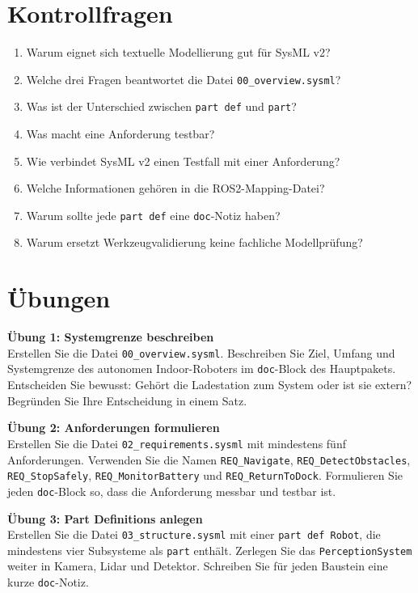 \section{Kontrollfragen}
\begin{enumerate}
    \item Warum eignet sich textuelle Modellierung gut für SysML v2?
    \item Welche drei Fragen beantwortet die Datei \texttt{00\_overview.sysml}?
    \item Was ist der Unterschied zwischen \texttt{part def} und \texttt{part}?
    \item Was macht eine Anforderung testbar?
    \item Wie verbindet SysML v2 einen Testfall mit einer Anforderung?
    \item Welche Informationen gehören in die ROS2-Mapping-Datei?
    \item Warum sollte jede \texttt{part def} eine \texttt{doc}-Notiz haben?
    \item Warum ersetzt Werkzeugvalidierung keine fachliche Modellprüfung?
\end{enumerate}

\section{Übungen}
\begin{uebungbox}
\textbf{Übung 1: Systemgrenze beschreiben}\\
Erstellen Sie die Datei \texttt{00\_overview.sysml}. Beschreiben Sie Ziel, Umfang und Systemgrenze des autonomen Indoor-Roboters im \texttt{doc}-Block des Hauptpakets. Entscheiden Sie bewusst: Gehört die Ladestation zum System oder ist sie extern? Begründen Sie Ihre Entscheidung in einem Satz.
\end{uebungbox}

\begin{uebungbox}
\textbf{Übung 2: Anforderungen formulieren}\\
Erstellen Sie die Datei \texttt{02\_requirements.sysml} mit mindestens fünf Anforderungen. Verwenden Sie die Namen \texttt{REQ\_Navigate}, \texttt{REQ\_DetectObstacles}, \texttt{REQ\_StopSafely}, \texttt{REQ\_MonitorBattery} und \texttt{REQ\_ReturnToDock}. Formulieren Sie jeden \texttt{doc}-Block so, dass die Anforderung messbar und testbar ist.
\end{uebungbox}

\begin{uebungbox}
\textbf{Übung 3: Part Definitions anlegen}\\
Erstellen Sie die Datei \texttt{03\_structure.sysml} mit einer \texttt{part def Robot}, die mindestens vier Subsysteme als \texttt{part} enthält. Zerlegen Sie das \texttt{PerceptionSystem} weiter in Kamera, Lidar und Detektor. Schreiben Sie für jeden Baustein eine kurze \texttt{doc}-Notiz.
\end{uebungbox}


